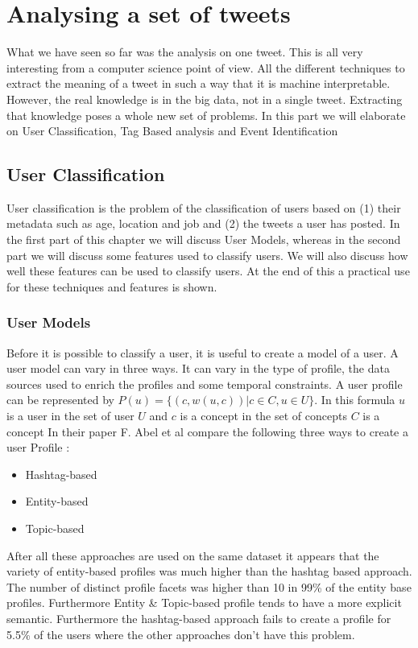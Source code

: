 \documentclass{article}
\begin{document}
\section*{Analysing a set of tweets}
What we have seen so far was the analysis on one tweet. This is all very interesting from a computer science point of view. All the different techniques to extract the meaning of a tweet in such a way that it is machine interpretable. However, the real knowledge is in the big data, not in a single tweet. Extracting that knowledge poses a whole new set of problems. In this part we will elaborate on User Classification, Tag Based analysis and Event Identification

\subsection{User Classification}
User classification is the problem of the classification of users based on (1) their metadata such as age, location and job and (2) the tweets a user has posted. In the first part of this chapter we will discuss User Models, whereas in the second part we will discuss some features used to classify users. We will also discuss how well these features can be used to classify users. At the end of this a practical use for these techniques and features is shown. 
\subsubsection*{User Models}
Before it is possible to classify a user, it is useful to create a model of a user. A user model can vary in three ways. It can vary in the type of profile, the data sources used to enrich the profiles and some temporal constraints. A user profile can be represented by $P(u) = \{(c, w(u,c))| c \in C, u \in U\}$. In this formula $u$ is a user in the set of user $U$ and $c$ is a concept in the set of concepts $C$ is a concept In their paper F. Abel et al compare the following three ways to create a user Profile \cite{usermodel}:
\begin{itemize}
\item Hashtag-based
\item Entity-based
\item Topic-based
\end{itemize}
After all these approaches are used on the same dataset it appears that the variety of entity-based profiles was much higher than the hashtag based approach. The number of distinct profile facets was higher than 10 in 99\% of the entity base profiles. Furthermore Entity \& Topic-based profile tends to have a more explicit semantic.  \cite{usermodel} Furthermore the hashtag-based approach fails to create a profile for 5.5\% of the users where the other approaches don't have this problem. 
\end{document}
